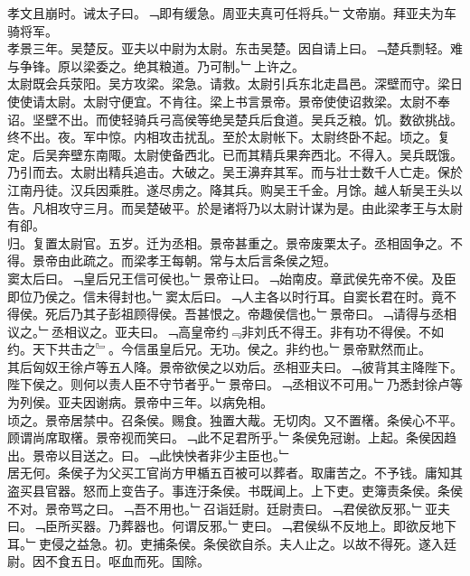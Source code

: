 \documentclass{zhvt-classic}
\begin{document}
\hspace*{2em}孝文且崩时。诫太子曰。﹁即有缓急。周亚夫真可任将兵。﹂文帝崩。拜亚夫为车骑将军。\\
\hspace*{2em}孝景三年。吴楚反。亚夫以中尉为太尉。东击吴楚。因自请上曰。﹁楚兵剽轻。难与争锋。原以梁委之。绝其粮道。乃可制。﹂上许之。\\
\hspace*{2em}太尉既会兵荥阳。吴方攻梁。梁急。请救。太尉引兵东北走昌邑。深壁而守。梁日使使请太尉。太尉守便宜。不肯往。梁上书言景帝。景帝使使诏救梁。太尉不奉诏。坚壁不出。而使轻骑兵弓高侯等绝吴楚兵后食道。吴兵乏粮。饥。数欲挑战。终不出。夜。军中惊。内相攻击扰乱。至於太尉帐下。太尉终卧不起。顷之。复定。后吴奔壁东南陬。太尉使备西北。已而其精兵果奔西北。不得入。吴兵既饿。乃引而去。太尉出精兵追击。大破之。吴王濞弃其军。而与壮士数千人亡走。保於江南丹徒。汉兵因乘胜。遂尽虏之。降其兵。购吴王千金。月馀。越人斩吴王头以告。凡相攻守三月。而吴楚破平。於是诸将乃以太尉计谋为是。由此梁孝王与太尉有卻。\\
\hspace*{2em}归。复置太尉官。五岁。迁为丞相。景帝甚重之。景帝废栗太子。丞相固争之。不得。景帝由此疏之。而梁孝王每朝。常与太后言条侯之短。\\
\hspace*{2em}窦太后曰。﹁皇后兄王信可侯也。﹂景帝让曰。﹁始南皮。章武侯先帝不侯。及臣即位乃侯之。信未得封也。﹂窦太后曰。﹁人主各以时行耳。自窦长君在时。竟不得侯。死后乃其子彭祖顾得侯。吾甚恨之。帝趣侯信也。﹂景帝曰。﹁请得与丞相议之。﹂丞相议之。亚夫曰。﹁高皇帝约﹃非刘氏不得王。非有功不得侯。不如约。天下共击之﹄。今信虽皇后兄。无功。侯之。非约也。﹂景帝默然而止。\\
\hspace*{2em}其后匈奴王徐卢等五人降。景帝欲侯之以劝后。丞相亚夫曰。﹁彼背其主降陛下。陛下侯之。则何以责人臣不守节者乎。﹂景帝曰。﹁丞相议不可用。﹂乃悉封徐卢等为列侯。亚夫因谢病。景帝中三年。以病免相。\\
\hspace*{2em}顷之。景帝居禁中。召条侯。赐食。独置大胾。无切肉。又不置櫡。条侯心不平。顾谓尚席取櫡。景帝视而笑曰。﹁此不足君所乎。﹂条侯免冠谢。上起。条侯因趋出。景帝以目送之。曰。﹁此怏怏者非少主臣也。﹂\\
\hspace*{2em}居无何。条侯子为父买工官尚方甲楯五百被可以葬者。取庸苦之。不予钱。庸知其盗买县官器。怒而上变告子。事连汙条侯。书既闻上。上下吏。吏簿责条侯。条侯不对。景帝骂之曰。﹁吾不用也。﹂召诣廷尉。廷尉责曰。﹁君侯欲反邪。﹂亚夫曰。﹁臣所买器。乃葬器也。何谓反邪。﹂吏曰。﹁君侯纵不反地上。即欲反地下耳。﹂吏侵之益急。初。吏捕条侯。条侯欲自杀。夫人止之。以故不得死。遂入廷尉。因不食五日。呕血而死。国除。\\
\end{document}
